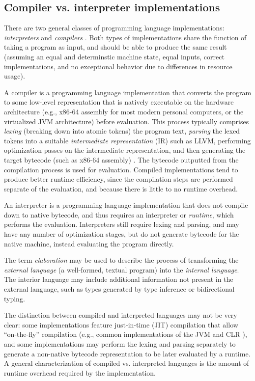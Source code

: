 \subsection{Compiler vs. interpreter implementations}
\label{sec:comp-vs-interp}

There are two general classes of programming language implementations: \textit{interpreters} and \textit{compilers} \cite{aho86}. Both types of implementations share the function of taking a program as input, and should be able to produce the same result (assuming an equal and determinstic machine state, equal inputs, correct implementations, and no exceptional behavior due to differences in resource usage).

A compiler is a programming language implementation that converts the program to some low-level representation that is natively executable on the hardware architecture (e.g., x86-64 assembly for most modern personal computers, or the virtualized JVM architecture) before evaluation. This process typically comprises \textit{lexing} (breaking down into atomic tokens) the program text, \textit{parsing} the lexed tokens into a suitable \textit{intermediate representation} (IR) such as LLVM, performing optimization passes on the intermediate representation, and then generating the target bytecode (such as x86-64 assembly) \cite{aho86}. The bytecode outputted from the compilation process is used for evaluation. Compiled implementations tend to produce better runtime efficiency, since the compilation steps are performed separate of the evaluation, and because there is little to no runtime overhead.

An interpreter is a programming language implementation that does not compile down to native bytecode, and thus requires an interpreter or \textit{runtime}, which performs the evaluation. Interpreters still require lexing and parsing, and may have any number of optimization stages, but do not generate bytecode for the native machine, instead evaluating the program directly.

The term \textit{elaboration} \cite{harper2000type} may be used to describe the process of transforming the \textit{external language} (a well-formed, textual program) into the \textit{internal language}. The interior language may include additional information not present in the external language, such as types generated by type inference or bidirectional typing.

The distinction between compiled and interpreted languages may not be very clear: some implementations feature just-in-time (JIT) compilation that allow ``on-the-fly'' compilation (e.g., common implementations of the JVM and CLR \cite{sestoft2002runtime}), and some implementations may perform the lexing and parsing separately to generate a non-native bytecode representation to be later evaluated by a runtime. A general characterization of compiled vs. interpreted languages is the amount of runtime overhead required by the implementation.

